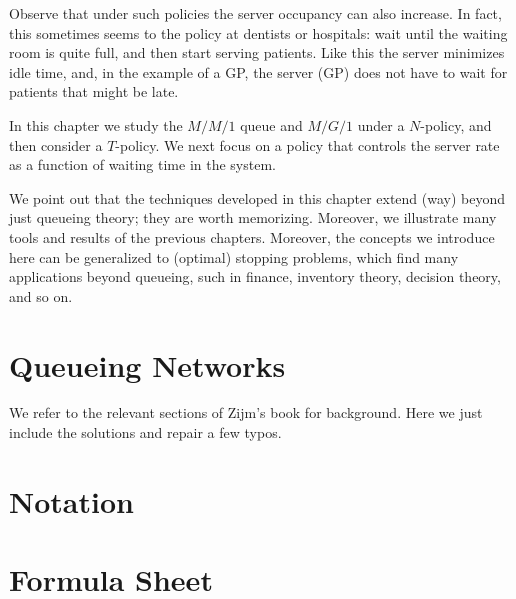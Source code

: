 Observe that under such policies the server occupancy can also increase.
In fact, this sometimes seems to the policy at dentists or hospitals: wait until the waiting room is quite full, and then start serving patients.
Like this the server minimizes idle time, and, in the example of a GP, the server (GP) does not have to wait for patients that might be late.

In this chapter we study the $M/M/1$ queue and $M/G/1$ under a $N$-policy, and then consider a $T$-policy.
We next focus on a policy that controls the server rate as a function of waiting time in the system.


We point out that the techniques developed in this chapter extend (way) beyond just queueing theory; they are worth memorizing.
Moreover, we illustrate many tools and results of the previous chapters.
Moreover, the concepts we introduce here can be generalized to (optimal) stopping problems, which find many applications beyond queueing, such in finance, inventory theory, decision theory, and so on.





%    

\chapter{Queueing Networks}
\label{sec:notes-relat-chapt2}

We refer to the relevant sections of Zijm's book for background. Here we just include the solutions and repair a few typos. 


%

%
%
%
%
%

%    



\backmatter





\chapter{Notation}
\label{sec:notation}


\chapter{Formula Sheet}


\printindex




